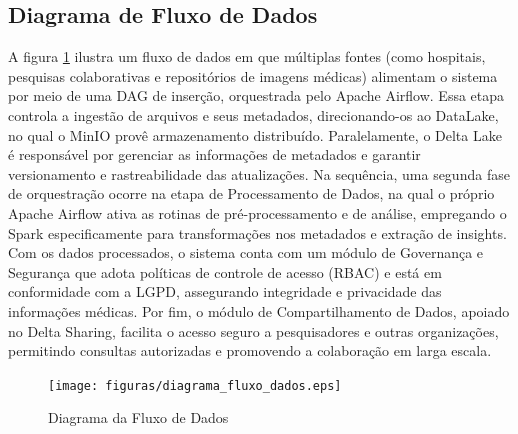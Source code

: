 \subsection{Diagrama de Fluxo de Dados}
A figura \ref{fig:fluxo_dados_projeto} ilustra um fluxo de dados em que múltiplas fontes (como hospitais, pesquisas colaborativas e repositórios de imagens médicas) alimentam o sistema por meio de uma DAG de inserção, orquestrada pelo Apache Airflow. Essa etapa controla a ingestão de arquivos e seus metadados, direcionando-os ao DataLake, no qual o MinIO provê armazenamento distribuído. Paralelamente, o Delta Lake é responsável por gerenciar as informações de metadados e garantir versionamento e rastreabilidade das atualizações. Na sequência, uma segunda fase de orquestração ocorre na etapa de Processamento de Dados, na qual o próprio Apache Airflow ativa as rotinas de pré-processamento e de análise, empregando o Spark especificamente para transformações nos metadados e extração de insights. Com os dados processados, o sistema conta com um módulo de Governança e Segurança que adota políticas de controle de acesso (RBAC) e está em conformidade com a LGPD, assegurando integridade e privacidade das informações médicas. Por fim, o módulo de Compartilhamento de Dados, apoiado no Delta Sharing, facilita o acesso seguro a pesquisadores e outras organizações, permitindo consultas autorizadas e promovendo a colaboração em larga escala.

\begin{figure}[h]
    \centering
    \texttt{[image: figuras/diagrama\_fluxo\_dados.eps]}
    \caption{Diagrama da Fluxo de Dados }
    \label{fig:fluxo_dados_projeto}
\end{figure} 



